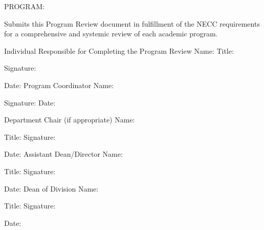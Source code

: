 

PROGRAM:



Submits this Program Review document in fulfillment of the NECC requirements for a comprehensive and systemic review of each academic program.

Individual Responsible for Completing the Program Review
Name:
Title:

Signature:

Date:
Program Coordinator
Name:

Signature:
Date:

Department Chair (if appropriate)
Name:

Title:
Signature:

Date:
Assistant Dean/Director
Name:

Title:
Signature:

Date:
Dean of Division
Name:

Title:
Signature:

Date:


